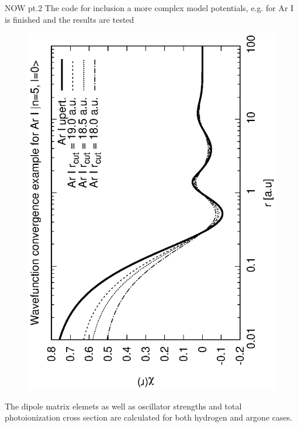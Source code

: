 \documentclass{beamer}
\begin{document}
\begin{frame}{NOW pt.2}
    The code for inclusion a more complex model potentials, e.g. for Ar I is finished and the results are tested
    
    \begin{figure}
        \includegraphics[scale=0.35,angle=-90]{fig/psi_Ar_n_5_l_0.eps}
    \end{figure}

    
    The dipole matrix elemets as well as oscillator strengths and total photoionization cross section are calculated for both hydrogen and argone cases.
    
    
\end{frame}
\end{document}
